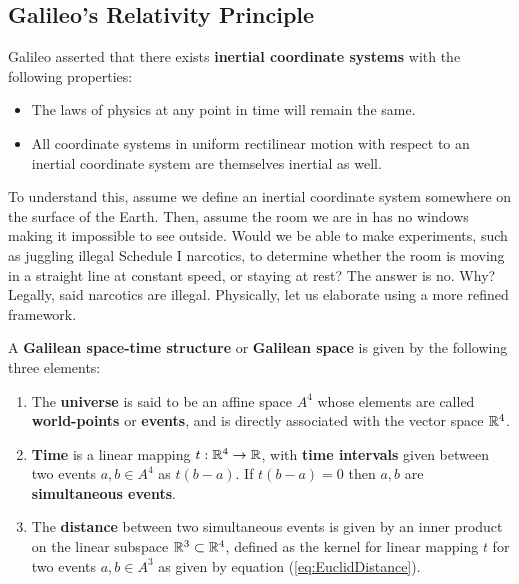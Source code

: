\documentclass{article}
\begin{document}
		\subsection{Galileo's Relativity Principle}
		Galileo asserted that there exists \textbf{inertial coordinate systems} with the following properties:
		\begin{itemize}
			\item The laws of physics at any point in time will remain the same.
			\item All coordinate systems in uniform rectilinear motion with respect to an inertial coordinate system are themselves inertial as well.
		\end{itemize}
		To understand this, assume we define an inertial coordinate system somewhere on the surface of the Earth. Then, assume the room we are in has no windows making it impossible to see outside. Would we be able to make experiments, such as juggling illegal Schedule I narcotics, to determine whether the room is moving in a straight line at constant speed, or staying at rest? The answer is no. Why? Legally, said narcotics are illegal. Physically, let us elaborate using a more refined framework.
		
		\begin{defn}
			A \textbf{Galilean space-time structure} or \textbf{Galilean space} is given by the following three elements:
			\begin{enumerate}
				\item The \textbf{universe} is said to be an affine space $A^4$ whose elements are called \textbf{world-points} or \textbf{events}, and is directly associated with the vector space $\mathbb{R}^4$.
				\item \textbf{Time} is a linear mapping $t: \mathbb{R}^4 \to \mathbb{R}$, with \textbf{time intervals} given between two events $a, b \in A^4$ as $t\left(b-a\right)$. If $t(b-a) =0$ then $a,b$ are \textbf{simultaneous events}.
				\item The \textbf{distance} between two simultaneous events is given by an inner product on the linear subspace $\mathbb{R}^3 \subset \mathbb{R}^4$, defined as the kernel for linear mapping $t$ for two events $a, b \in A^3$ as given by equation (\ref{eq:EuclidDistance}). 
			\end{enumerate}
		\end{defn}
		
\end{document}
